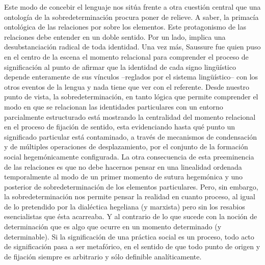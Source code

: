\documentclass{book}
\begin{document}
Este modo de concebir el lenguaje nos sitúa frente a otra cuestión
central que una ontología de la sobredeterminación procura poner de
relieve. A saber, la primacía ontológica de las relaciones por sobre los
elementos. Este protagonismo de las relaciones debe entender en un doble
sentido. Por un lado, implica una desubstanciación radical de toda
identidad. Una vez más, Saussure fue quien puso en el centro de la
escena el momento relacional para comprender el proceso de significación
al punto de afirmar que la identidad de cada signo lingüístico depende
enteramente de sus vínculos --reglados por el sistema lingüístico-- con
los otros eventos de la lengua y nada tiene que ver con el referente.
Desde nuestro punto de vista, la sobredeterminación, en tanto lógica que
permite comprender el modo en que se relacionan las identidades
particulares con un entorno parcialmente estructurado está mostrando la
centralidad del momento relacional en el proceso de fijación de sentido,
esta evidenciando hasta qué punto un significado particular está
contaminado, a través de mecanismos de condensación y de múltiples
operaciones de desplazamiento, por el conjunto de la formación social
hegemónicamente configurada. La otra consecuencia de esta preeminencia
de las relaciones es que no debe hacernos pensar en una linealidad
ordenada temporalmente al modo de un primer momento de sutura hegemónica
y uno posterior de sobredeterminación de los elementos particulares.
Pero, sin embargo, la sobredeterminación nos permite pensar la realidad
en cuanto proceso, al igual de lo pretendido por la dialéctica hegeliana
(y marxista) pero sin los resabios esencialistas que ésta acarreaba. Y
al contrario de lo que sucede con la noción de determinación que es algo
que ocurre en un momento determinado (y determinable). Si la
significación de una práctica social es un proceso, todo acto de
significación pasa a ser metafórico, en el sentido de que todo punto de
origen y de fijación siempre es arbitrario y sólo definible
analíticamente.
\end{document}
